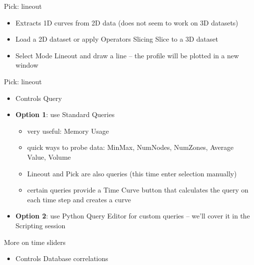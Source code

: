 \begin{frame}{Pick: lineout}
  \begin{itemize}\setlength{\itemsep}{2mm}
  \item Extracts 1D curves from 2D data (does not seem to work on 3D datasets)
  \item Load a 2D dataset or apply Operators \ra Slicing \ra Slice to a 3D dataset
  \item Select Mode \ra Lineout and draw a line -- the profile will be plotted in a new window
  \end{itemize}
\end{frame}


\begin{frame}{Pick: lineout}
  \begin{itemize}\setlength{\itemsep}{2mm}
  \item Controls \ra Query
  \item {\bf Option 1}: use Standard Queries
    \begin{itemize}\setlength{\itemsep}{0mm}
    \item very useful: Memory Usage
    \item quick ways to probe data: MinMax, NumNodes, NumZones, Average Value, Volume
    \item Lineout and Pick are also queries (this time enter selection manually)
    \item certain queries provide a Time Curve button that calculates the query on each time step and
      creates a curve
    \end{itemize}
  \item {\bf Option 2}: use Python Query Editor for custom queries -- we'll cover it in the Scripting
    session
  \end{itemize}
\end{frame}

\begin{frame}{More on time sliders}
  \begin{itemize}\setlength{\itemsep}{2mm}
  \item Controls \ra Database correlations
  \end{itemize}
\end{frame}
